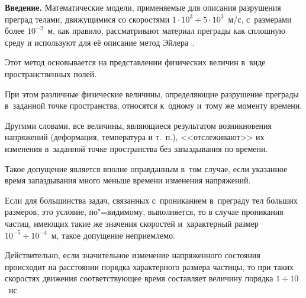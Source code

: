 \date{29/VII/2013} %









\maketitle








\textbf{Введение.} Математические модели, применяемые для описания разрушения преград телами, движущимися со скоростями $1\cdot 10^{3} \div5\cdot 10^{3}$~м/с,  с~размерами более $10^{-2}$~м, как правило, рассматривают материал преграды как сплошную среду и используют для её описание метод Эйлера~\cite{bib:L, bib:F}. 

Этот метод основывается на представлении физических величин в~виде пространственных полей. 

При этом различные физические величины, определяющие разрушение преграды в~заданной точке пространства, относятся к~одному и~тому же моменту времени. 

Другими словами, все величины, являющиеся результатом возникновения напряжений (деформация, температура и т.~п.), <<отслеживают>> их изменения в~заданной точке пространства без запаздывания по времени. 

Такое допущение является вполне оправданным в~том случае, если указанное время запаздывания много меньше времени изменения напряжений. 

Если для большинства задач, связанных с~прониканием в~преграду тел больших размеров, это условие, по"=видимому, выполняется, то в случае проникания частиц, имеющих такие же значения скоростей и~характерный размер $10^{-5}\div10^{-4} $~м, такое допущение неприемлемо. 

Действительно, если значительное изменение напряженного состояния происходит на расстоянии порядка характерного размера частицы, то при таких скоростях движения соответствующее время составляет величину порядка $1\div10$~нс. 

